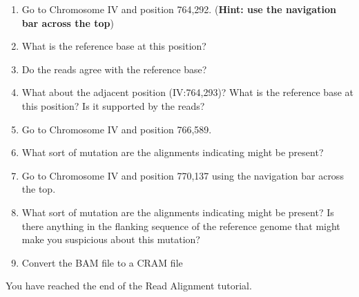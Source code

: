 \documentclass[11pt]{article}
\begin{document}
\begin{enumerate}
\def\labelenumi{\arabic{enumi}.}
\item
  Go to Chromosome IV and position 764,292. (\textbf{Hint: use the
  navigation bar across the top})
\item
  What is the reference base at this position?
\item
  Do the reads agree with the reference base?
\item
  What about the adjacent position (IV:764,293)? What is the reference
  base at this position? Is it supported by the reads?
\item
  Go to Chromosome IV and position 766,589.
\item
  What sort of mutation are the alignments indicating might be present?
\item
  Go to Chromosome IV and position 770,137 using the navigation bar
  across the top.
\item
  What sort of mutation are the alignments indicating might be present?
  Is there anything in the flanking sequence of the reference genome
  that might make you suspicious about this mutation?
\item
  Convert the BAM file to a CRAM file
\end{enumerate}

    You have reached the end of the Read Alignment tutorial.


\end{document}
